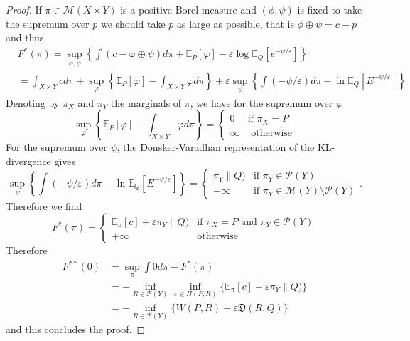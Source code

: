 \documentclass[10pt,a4paper]{amsart}
\begin{document}
\begin{proof}
If $\pi\in \mathcal{M}(X \times Y)$ is a positive Borel measure and $(\phi,\psi)$ is fixed to take the supremum over $p$  we should take $p$ 
as large as possible, that is $\phi \oplus \psi = c-p$ and thus 
\begin{equation}
\begin{aligned}
&F^*(\pi) = \sup_{\varphi, \psi} 
\left\{ 
\int (c - \varphi \oplus \psi) d\pi   + \mathbb{E}_P[\varphi] -\varepsilon\log \mathbb{E}_Q[e^{-\psi/\varepsilon}]
\right\}
\\
& = \int_{X \times Y} c  d\pi  + \sup_{\varphi} \left\{ \mathbb{E}_P[\varphi] - \int_{X \times Y} \varphi d\pi\right\} 
+ \varepsilon \sup_{\psi} \left\{ \int (-\psi/\varepsilon) d\pi 
- \ln \mathbb{E}_Q[ E^{-\psi/\varepsilon} ]
\right\} 
\end{aligned}
\end{equation}
Denoting by $\pi_X$ and $\pi_Y$ the marginals of $\pi$, we have for the supremum over $\varphi$
\begin{equation}
\sup_{\varphi} \left\{ \mathbb{E}_P[\varphi] - \int_{X \times Y} \varphi d\pi\right\}=\left\{
\begin{array}{cl} 0 & \textrm{if } \pi_X= P \\
\infty & \textrm{ otherwise} \end{array} 
\right.
\end{equation}
For the supremum over $\psi$, the Donsker-Varadhan representation of the KL-divergence gives
\begin{equation}
\sup_{\psi} \left\{ \int (-\psi/\varepsilon) d\pi 
- \ln \mathbb{E}_Q[ E^{-\psi/\varepsilon} ] \right\}= \left\{ 
\begin{array}{cl}  \mathfrak{}\pi_Y\|Q) & \textrm{if }\pi_Y \in \mathcal{P}(Y) \\
+ \infty & \textrm{if }  \pi_Y \in \mathcal{M}(Y) \setminus \mathcal{P}(Y) 
\end{array}
\right. .
\end{equation}
Therefore we find 
\begin{equation}
F^*(\pi) =  \left\{
\begin{array}{cl}
\mathbb{E}_{\pi}[c] + \varepsilon \mathfrak{} \pi_Y \|Q)  & \textrm{if } \pi_X =P \textrm{ and } \pi_Y \in \mathcal{P}(Y) \\
+\infty & \textrm{otherwise}
\end{array}
\right.
\end{equation}
Therefore 
\begin{equation}
\begin{aligned}
F^{**}(0) & =\sup_{\pi} \int 0 d\pi - F^*(\pi) \\
& =-  \inf_{R \in \mathcal{P}(Y)} \inf_{\pi \in \Pi(P,R)} \{ \mathbb{E}_{\pi}[c] + \varepsilon \mathfrak{} \pi_Y \|Q) \} \\
&= - \inf_{R \in \mathcal{P}(Y)}\{ W(P,R) + \varepsilon \mathfrak{D}(R, Q)\}
\end{aligned}
\end{equation}
and this concludes the proof. 
\end{proof}
\end{document}
